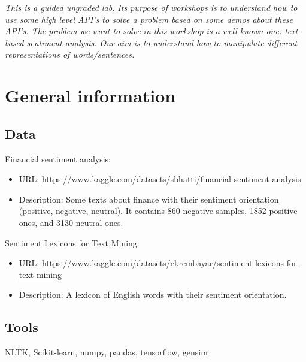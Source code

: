 \documentclass{../extra/aakpract/aakpract}
\begin{document}
\maketitle

\begin{center}
	\begin{minipage}{0.85\textwidth}
		\small\itshape
		This is a guided ungraded lab. 
		Its purpose of workshops is to understand how to use some high level API's to solve a problem based on some demos about these API's.
		The problem we want to solve in this workshop is a well known one: text-based sentiment analysis.
		Our aim is to understand how to manipulate different representations of words/sentences.
	\end{minipage}
\end{center}


\section*{General information}

\subsection{Data}

Financial sentiment analysis:
\begin{itemize}
	\item URL: \url{https://www.kaggle.com/datasets/sbhatti/financial-sentiment-analysis}
	\item Description: Some texts about finance with their sentiment orientation (positive, negative, neutral).
	It contains 860 negative samples, 1852 positive ones, and 3130 neutral ones.
\end{itemize}

Sentiment Lexicons for Text Mining:
\begin{itemize}
	\item URL: \url{https://www.kaggle.com/datasets/ekrembayar/sentiment-lexicons-for-text-mining}
	\item Description: A lexicon of English words with their sentiment orientation.
\end{itemize}

\subsection{Tools}

NLTK, Scikit-learn, numpy, pandas, tensorflow, gensim
\end{document}

